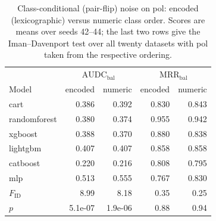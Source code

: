 \documentclass[pdflatex,sn-mathphys]{sn-jnl}
\newcommand{\AUDC}{\mathrm{AUDC}}
\newcommand{\MRR}{\mathrm{MRR}}
\theoremstyle{thmstyleone}
\begin{document}
\begin{table}[htbp]
\centering\small
\caption{Class-conditional (pair-flip) noise on pol: encoded (lexicographic) versus numeric class order. Scores are means over seeds 42--44; the last two rows give the Iman--Davenport test over all twenty datasets with pol taken from the respective ordering.}\label{tab:pol_ordering}
\begin{tabular}{@{}lrrrr@{}}
\toprule
 & \multicolumn{2}{c}{$\AUDC_{\mathrm{bal}}$} & \multicolumn{2}{c}{$\MRR_{\mathrm{bal}}$} \\
Model & encoded & numeric & encoded & numeric \\
\midrule
cart & 0.386 & 0.392 & 0.830 & 0.843 \\
randomforest & 0.380 & 0.374 & 0.955 & 0.942 \\
xgboost & 0.388 & 0.370 & 0.880 & 0.838 \\
lightgbm & 0.407 & 0.407 & 0.858 & 0.858 \\
catboost & 0.220 & 0.216 & 0.808 & 0.795 \\
mlp & 0.513 & 0.555 & 0.767 & 0.830 \\
\midrule
$F_{\mathrm{ID}}$ & 8.99 & 8.18 & 0.35 & 0.25 \\
$p$ & 5.1e-07 & 1.9e-06 & 0.88 & 0.94 \\
\bottomrule
\end{tabular}
\end{table}


\end{document}
